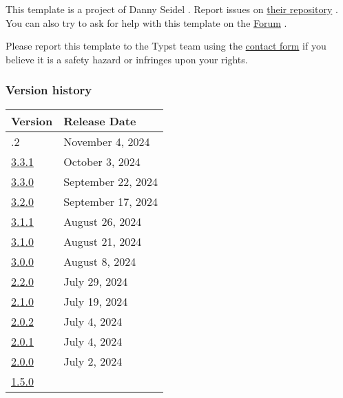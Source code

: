 This template is a project of Danny Seidel . Report issues on
\href{https://github.com/DannySeidel/typst-dhbw-template}{their
repository} . You can also try to ask for help with this template on the
\href{https://forum.typst.app}{Forum} .

Please report this template to the Typst team using the
\href{https://typst.app/contact}{contact form} if you believe it is a
safety hazard or infringes upon your rights.

\label{versions}
\subsubsection{Version history}\label{version-history}

\begin{longtable}[]{@{}ll@{}}
\toprule\noalign{}
Version & Release Date \\
\midrule\noalign{}
\endhead
\bottomrule\noalign{}
\endlastfoot
3.3.2 & November 4, 2024 \\
\href{https://typst.app/universe/package/supercharged-dhbw/3.3.1/}{3.3.1}
& October 3, 2024 \\
\href{https://typst.app/universe/package/supercharged-dhbw/3.3.0/}{3.3.0}
& September 22, 2024 \\
\href{https://typst.app/universe/package/supercharged-dhbw/3.2.0/}{3.2.0}
& September 17, 2024 \\
\href{https://typst.app/universe/package/supercharged-dhbw/3.1.1/}{3.1.1}
& August 26, 2024 \\
\href{https://typst.app/universe/package/supercharged-dhbw/3.1.0/}{3.1.0}
& August 21, 2024 \\
\href{https://typst.app/universe/package/supercharged-dhbw/3.0.0/}{3.0.0}
& August 8, 2024 \\
\href{https://typst.app/universe/package/supercharged-dhbw/2.2.0/}{2.2.0}
& July 29, 2024 \\
\href{https://typst.app/universe/package/supercharged-dhbw/2.1.0/}{2.1.0}
& July 19, 2024 \\
\href{https://typst.app/universe/package/supercharged-dhbw/2.0.2/}{2.0.2}
& July 4, 2024 \\
\href{https://typst.app/universe/package/supercharged-dhbw/2.0.1/}{2.0.1}
& July 4, 2024 \\
\href{https://typst.app/universe/package/supercharged-dhbw/2.0.0/}{2.0.0}
& July 2, 2024 \\
\href{https://typst.app/universe/package/supercharged-dhbw/1.5.0/}{1.5.0}

\end{longtable}
